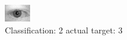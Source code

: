 \begin{figure}[h!]
\begin{center}
\includegraphics[width=0.60\columnwidth]{figures/ID645_class_2_target_3.png}
\end{center}
\caption{ Classification: 2 actual target: 3}
\label{fig:ID645_class_2_target_3}
\end{figure}
